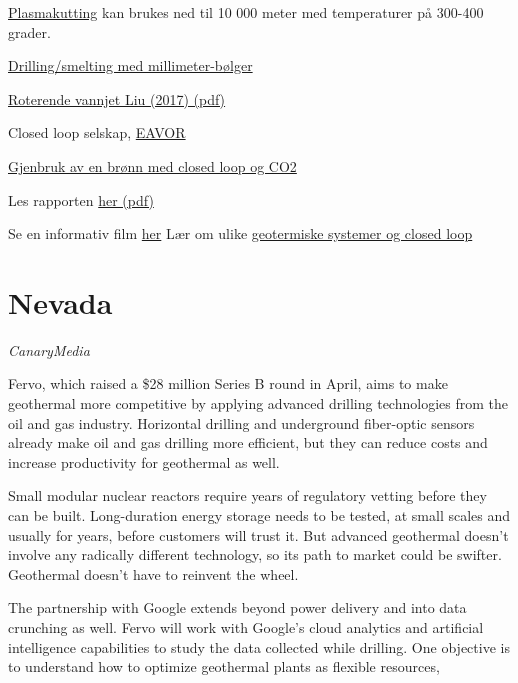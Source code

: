 \documentclass[
]{book}
\begin{document}
\href{https://www.euractiv.com/section/energy/opinion/european-technology-unlocking-deep-geothermal-energy-for-all/}{Plasmakutting} kan brukes ned til 10 000 meter med temperaturer på 300-400 grader.

\href{https://www.journals.elsevier.com/renewable-energy-focus}{Drilling/smelting med millimeter-bølger}

\href{pdf/Liu_2017_Drilling_Water_Jet.pdf}{Roterende vannjet Liu (2017) (pdf)}

Closed loop selskap, \href{https://www.euractiv.com/section/energy/news/closed-loop-technology-brings-promise-of-geothermal-anywhere/}{EAVOR}

\href{https://www.greenfireenergy.com/how-does-geothermal-energy-work/}{Gjenbruk av en brønn med closed loop og CO2}

Les rapporten \href{pdf/Almaya_2020_Closed_Loop_geothermal.pdf}{her (pdf)}

Se en informativ film \href{https://youtu.be/g0sHVsC1cF4}{her}
Lær om ulike \href{https://youtu.be/PtQmGPmyLA0}{geotermiske systemer og closed loop}

\hypertarget{nevada}{%
\section{Nevada}\label{nevada}}

\emph{CanaryMedia}

Fervo, which raised a \$28 million Series B round in April, aims to make geothermal more competitive by applying advanced drilling technologies from the oil and gas industry. Horizontal drilling and underground fiber-optic sensors already make oil and gas drilling more efficient, but they can reduce costs and increase productivity for geothermal as well.

Small modular nuclear reactors require years of regulatory vetting before they can be built. Long-duration energy storage needs to be tested, at small scales and usually for years, before customers will trust it. But advanced geothermal doesn't involve any radically different technology, so its path to market could be swifter.
Geothermal doesn't have to reinvent the wheel.

The partnership with Google extends beyond power delivery and into data crunching as well. Fervo will work with Google's cloud analytics and artificial intelligence capabilities to study the data collected while drilling. One objective is to understand how to optimize geothermal plants as flexible resources,
\end{document}
